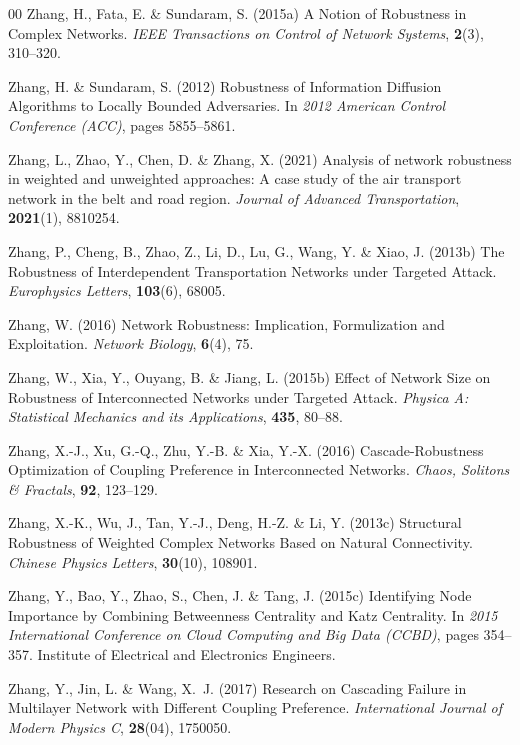 \documentclass{comnet-mod}
\begin{document}
\begin{thebibliography}{00}
Zhang, H., Fata, E. {\&} Sundaram, S. (2015a)  {A {{Notion}} of {{Robustness}}
  in {{Complex Networks}}}. {\em {IEEE Transactions on Control of Network
  Systems}}, \textbf{2}(3), 310--320.

Zhang, H. {\&} Sundaram, S. (2012)  {Robustness of Information Diffusion
  Algorithms to Locally Bounded Adversaries}. In {\em {2012 {{American Control
  Conference}} ({{ACC}})}}, pages 5855--5861.

Zhang, L., Zhao, Y., Chen, D. {\&} Zhang, X. (2021)  Analysis of network
  robustness in weighted and unweighted approaches: {A} case study of the air
  transport network in the belt and road region. {\em {Journal of Advanced
  Transportation}}, \textbf{2021}(1), 8810254.

Zhang, P., Cheng, B., Zhao, Z., Li, D., Lu, G., Wang, Y. {\&} Xiao, J. (2013b)
  {The Robustness of Interdependent Transportation Networks under Targeted
  Attack}. {\em {Europhysics Letters}}, \textbf{103}(6), 68005.

Zhang, W. (2016)  {Network Robustness: {{Implication}}, Formulization and
  Exploitation}. {\em {Network Biology}}, \textbf{6}(4), 75.

Zhang, W., Xia, Y., Ouyang, B. {\&} Jiang, L. (2015b)  {Effect of Network Size
  on Robustness of Interconnected Networks under Targeted Attack}. {\em
  {Physica A: Statistical Mechanics and its Applications}}, \textbf{435},
  80--88.

Zhang, X.-J., Xu, G.-Q., Zhu, Y.-B. {\&} Xia, Y.-X. (2016)  {Cascade-Robustness
  Optimization of Coupling Preference in Interconnected Networks}. {\em {Chaos,
  Solitons \& Fractals}}, \textbf{92}, 123--129.

Zhang, X.-K., Wu, J., Tan, Y.-J., Deng, H.-Z. {\&} Li, Y. (2013c)  {Structural
  Robustness of Weighted Complex Networks Based on Natural Connectivity}. {\em
  {Chinese Physics Letters}}, \textbf{30}(10), 108901.

Zhang, Y., Bao, Y., Zhao, S., Chen, J. {\&} Tang, J. (2015c)  {Identifying Node
  Importance by Combining Betweenness Centrality and Katz Centrality}. In {\em
  {2015 {{International Conference}} on {{Cloud Computing}} and {{Big Data}}
  ({{CCBD}})}}, pages 354--357. {Institute of Electrical and Electronics
  Engineers}.

Zhang, Y., Jin, L. {\&} Wang, X.~J. (2017)  {Research on Cascading Failure in
  Multilayer Network with Different Coupling Preference}. {\em {International
  Journal of Modern Physics C}}, \textbf{28}(04), 1750050.


\end{thebibliography}
\end{document}
